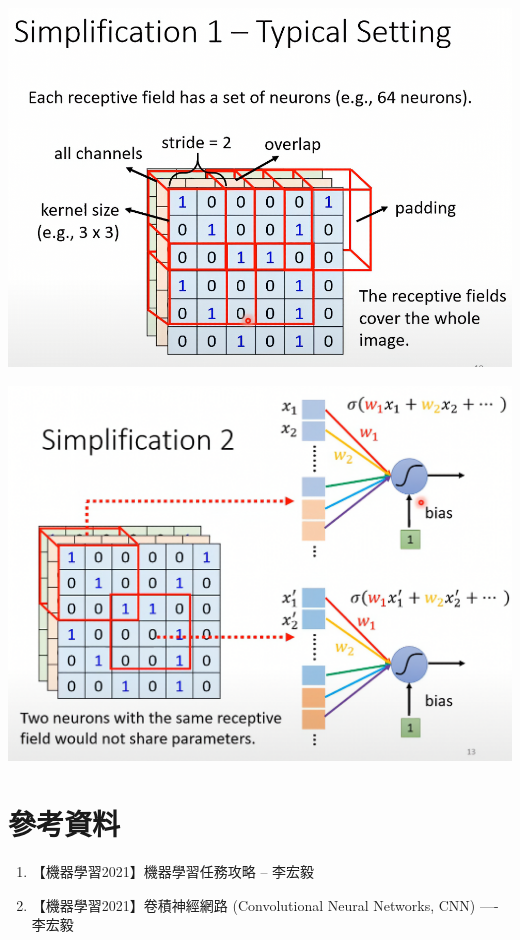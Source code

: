 \noindent\begin{minipage}[t]{.45\linewidth}\vspace{0pt}
  \includegraphics[width=1\textwidth]{paste_src/2025-03-20-15-08-14.png}
\end{minipage}
\begin{minipage}[t]{.45\linewidth}\vspace{0pt}
  \includegraphics[width=1\textwidth]{paste_src/2025-03-20-15-13-31.png}
\end{minipage}


\section*{參考資料} 

\begin{enumerate}
  \item 【機器學習2021】機器學習任務攻略 -- 李宏毅
  \item 【機器學習2021】卷積神經網路 (Convolutional Neural Networks, CNN) ---- 李宏毅
\end{enumerate}
